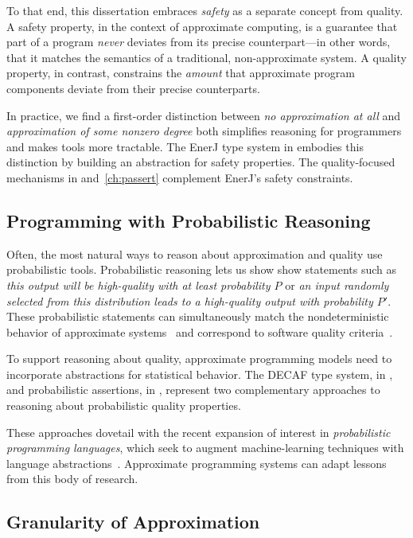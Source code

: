To that end, this dissertation embraces \emph{safety} as a separate concept
from quality.
A safety property, in the context of approximate computing, is a guarantee
that part of a program \emph{never} deviates from its precise counterpart---in
other words, that it matches the semantics of a traditional, non-approximate
system.
A quality property, in contrast, constrains the \emph{amount} that approximate
program components deviate from their precise counterparts.

In practice, we find a first-order distinction between \emph{no approximation at
all} and \emph{approximation of some nonzero degree} both simplifies reasoning
for programmers and makes tools more tractable.
The EnerJ type system in  embodies this distinction by
building an abstraction for safety properties.
The quality-focused mechanisms in  and~\ref{ch:passert}
complement EnerJ's safety constraints.

\subsection{Programming with Probabilistic Reasoning}

Often, the most natural ways to reason about approximation and quality use
probabilistic tools.
Probabilistic reasoning lets us show show statements such as \emph{this output
will be high-quality with at least probability $P$} or \emph{an input randomly
selected from this distribution leads to a high-quality output with
probability $P'$}.
These probabilistic statements can simultaneously match the nondeterministic behavior
of approximate systems~\cite{truffle, npu, approxstorage}
and correspond to software quality criteria~\cite{decaf, passert}.

To support reasoning about quality, approximate
programming models need to incorporate abstractions for statistical behavior.
The DECAF type system, in , and
probabilistic assertions, in , represent two
complementary approaches to reasoning about probabilistic quality
properties.

These approaches dovetail with the recent expansion of interest in
\emph{probabilistic programming languages}, which seek to augment
machine-learning techniques with language abstractions~\cite{church}.
Approximate programming systems can adapt lessons from this body of research.

\subsection{Granularity of Approximation}

